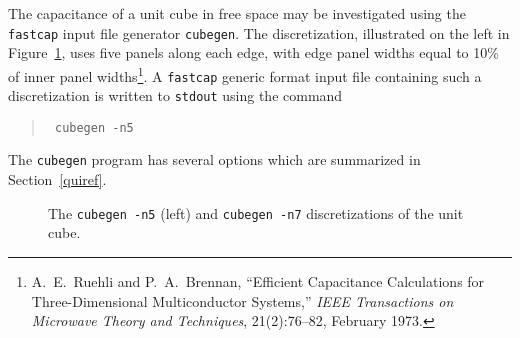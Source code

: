 The capacitance of a unit cube in free space may be investigated using
the {\tt fastcap} input file generator {\tt cubegen}. The
discretization, illustrated on the left in Figure~\ref{cubes}, uses five panels
along each edge, with edge panel widths equal to 10\% of inner panel
widths\footnote{A.\ E.\ Ruehli and P.\ A.\ Brennan,
``Efficient Capacitance Calculations for Three-Dimensional
                Multiconductor Systems,''
{\em IEEE Transactions on Microwave Theory and Techniques}, 21(2):76--82, 
February 1973.}. 
A {\tt fastcap} generic format
input file containing such a discretization is written to {\tt stdout}
using the command
\begin{quote}\tt
cubegen -n5
\end{quote}
The {\tt cubegen} program has several options which are summarized
in Section~\ref{quiref}. 
%
%
\begin{figure}
\centerline{
}
\caption{The {\tt cubegen -n5} (left) and {\tt cubegen -n7} discretizations of the unit cube.}
\label{cubes}
\end{figure}

